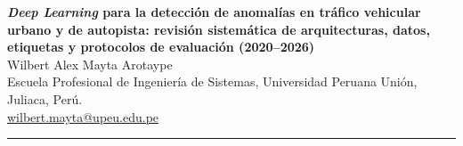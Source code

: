 \documentclass[12pt, a4paper]{article}
\begin{document}

\begin{center}
  {\LARGE\bfseries\color{azulPrincipal}
   \textit{Deep Learning} para la detecci\'{o}n de anomal\'{i}as en tr\'{a}fico vehicular urbano y de autopista: revisi\'{o}n sistem\'{a}tica de arquitecturas, datos, etiquetas y protocolos de evaluaci\'{o}n (2020--2026)}\\[1em]

  {\large Wilbert Alex Mayta Arotaype}\\[0.6em]

  {\small
    Escuela Profesional de Ingenier\'{i}a de Sistemas,
    Universidad Peruana Uni\'{o}n, Juliaca, Per\'{u}.\\
    \href{mailto:wilbert.mayta@upeu.edu.pe}{wilbert.mayta@upeu.edu.pe}
  }\\[0.8em]
\end{center}
\noindent\rule{\linewidth}{1pt}

\end{document}
